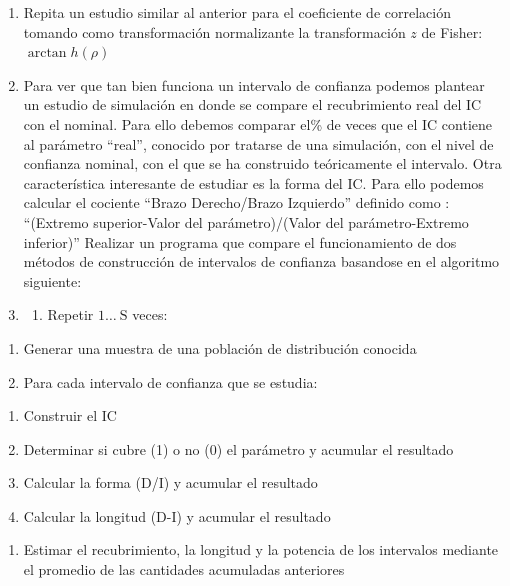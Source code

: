 \documentclass[
]{article}
\providecommand{\tightlist}{%
  \setlength{\itemsep}{0pt}\setlength{\parskip}{0pt}}
\begin{document}
\begin{enumerate}
\def\labelenumi{\arabic{enumi}.}
\setcounter{enumi}{6}
\tightlist
\item
  Repita un estudio similar al anterior para el coeficiente de correlación tomando como transformación normalizante la transformación \(z\) de Fisher: \(\arctan h(\rho)\)
\item
  Para ver que tan bien funciona un intervalo de confianza podemos plantear un estudio de simulación en donde se compare el recubrimiento real del IC con el nominal. Para ello debemos comparar el\% de veces que el IC contiene al parámetro ``real'', conocido por tratarse de una simulación, con el nivel de confianza nominal, con el que se ha construido teóricamente el intervalo. Otra característica interesante de estudiar es la forma del IC. Para ello podemos calcular el cociente ``Brazo Derecho/Brazo Izquierdo'' definido como :
  ``(Extremo superior-Valor del parámetro)/(Valor del parámetro-Extremo inferior)''
  Realizar un programa que compare el funcionamiento de dos métodos de construcción de intervalos de confianza basandose en el algoritmo siguiente:
\item
  \begin{enumerate}
  \def\labelenumii{\alph{enumii})}
  \tightlist
  \item
    Repetir \(1 \ldots \mathrm{~S}\) veces:
  \end{enumerate}
\end{enumerate}

\begin{enumerate}
\def\labelenumi{\alph{enumi})}
\setcounter{enumi}{1}
\tightlist
\item
  Generar una muestra de una población de distribución conocida
\item
  Para cada intervalo de confianza que se estudia:
\end{enumerate}

\begin{enumerate}
\def\labelenumi{\arabic{enumi})}
\tightlist
\item
  Construir el IC
\item
  Determinar si cubre (1) o no (0) el parámetro y acumular el resultado
\item
  Calcular la forma (D/I) y acumular el resultado
\item
  Calcular la longitud (D-I) y acumular el resultado
\end{enumerate}

\begin{enumerate}
\def\labelenumi{\alph{enumi})}
\setcounter{enumi}{3}
\tightlist
\item
  Estimar el recubrimiento, la longitud y la potencia de los intervalos mediante el promedio de las cantidades acumuladas anteriores
\end{enumerate}
\end{document}
